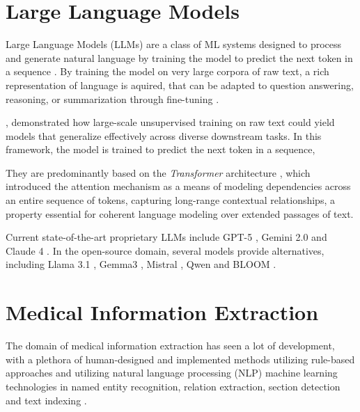 \documentclass[bs, english]{stthesis}
\begin{document}
\section{Large Language Models}

Large Language Models (LLMs) are a class of ML \cite{samuelStudiesMachineLearning1959} systems designed to process and generate natural language by training the model to predict the next token in a sequence \cite{wangHistoryDevelopmentPrinciples2025}. By training the model on very large corpora of raw text, a rich representation of language is aquired, that can be adapted to question answering, reasoning, or summarization through fine-tuning \cite{radfordImprovingLanguageUnderstanding2018}. 

, demonstrated how large-scale unsupervised training on raw text could yield models that generalize effectively across diverse downstream tasks. In this framework, the model is trained to predict the next token in a sequence, 

They are predominantly based on the \emph{Transformer} architecture \cite{vaswaniAttentionAllYou2023}, which introduced the attention mechanism as a means of modeling dependencies across an entire sequence of tokens, capturing long-range contextual relationships, a property essential for coherent language modeling over extended passages of text.

Current state-of-the-art proprietary LLMs include GPT-5 \cite{IntroducingGPT52025}, Gemini 2.0 \cite{IntroducingGemini202024} and Claude 4 \cite{IntroducingClaude4}. In the open-source domain, several models provide alternatives, including Llama 3.1 \cite{IntroducingLlama31,grattafioriLlama3Herd2024}, Gemma3 \cite{teamGemma3Technical2025}, Mistral \cite{jiangMistral7B2023}, Qwen \cite{baiQwenTechnicalReport2023} and BLOOM \cite{workshopBLOOM176BParameterOpenAccess2023}.

\section{Medical Information Extraction}
\label{sec:MedicalIE}

The domain of medical information extraction has seen a lot of development, with a plethora of human-designed and implemented methods utilizing rule-based approaches and utilizing natural language processing (NLP) machine learning technologies in named entity recognition, relation extraction, section detection and text indexing \cite{landolsiInformationExtractionElectronic2023}.
\end{document}
